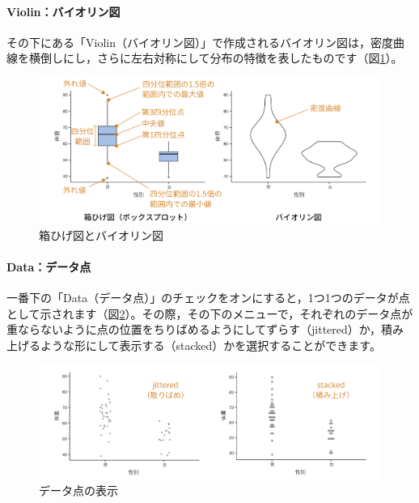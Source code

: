 \documentclass[
  12pt,
  a5jpaper,
  lualatex, ja=standard]{bxjsbook}
\begin{document}
\hypertarget{violinux30d0ux30a4ux30aaux30eaux30f3ux56f3}{%
\paragraph*{Violin：バイオリン図}\label{violinux30d0ux30a4ux30aaux30eaux30f3ux56f3}}

その下にある「Violin（バイオリン図）」で作成されるバイオリン図は，密度曲線を横倒しにし，さらに左右対称にして分布の特徴を表したものです（図\ref{fig:Exploration-descriptives-plots-box}）。

\begin{figure}[!ht]

{\centering \includegraphics[width=1\linewidth]{images/exploration/Exploration-descriptives-plots-box} 

}

\caption{箱ひげ図とバイオリン図}\label{fig:Exploration-descriptives-plots-box}
\end{figure}

\hypertarget{dataux30c7ux30fcux30bfux70b9}{%
\paragraph*{Data：データ点}\label{dataux30c7ux30fcux30bfux70b9}}

一番下の「Data（データ点）」のチェックをオンにすると，1つ1つのデータが点として示されます（図\ref{fig:Exploration-descriptives-plots-data-jittered}）。その際，その下のメニューで，それぞれのデータ点が重ならないように点の位置をちりばめるようにしてずらす（jittered）か，積み上げるような形にして表示する（stacked）かを選択することができます。

\begin{figure}[!ht]

{\centering \includegraphics[width=1\linewidth]{images/exploration/Exploration-descriptives-plots-data-jittered} 

}

\caption{データ点の表示}\label{fig:Exploration-descriptives-plots-data-jittered}
\end{figure}
\end{document}
